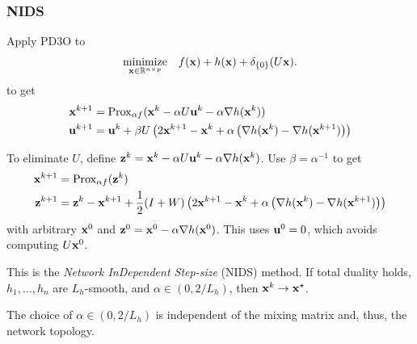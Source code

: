 \documentclass[10pt,mathserif]{beamer}
\begin{document}
\begin{frame}
\frametitle{NIDS}
Apply PD3O to 
\[
\begin{array}{ll}
\underset{{\mathbf{x}}\in\mathbb{R}^{n\times p}}{\mbox{minimize}} & f({\mathbf{x}}) + h({\mathbf{x}}) + \delta_{\{0\}}(U{\mathbf{x}}).
\end{array}
\]
to get
\begin{align*}
  {\mathbf{x}}^{k+1} & = \mathrm{Prox}_{\alpha f}({\mathbf{x}}^k - \alpha U  {\mathbf{u}}^k - \alpha \nabla h({\mathbf{x}}^k))\\
  {\mathbf{u}}^{k+1} & = {\mathbf{u}}^k + \beta U\left(2{\mathbf{x}}^{k+1}-{\mathbf{x}}^{k} + \alpha \left(\nabla h({\mathbf{x}}^k) - \nabla h({\mathbf{x}}^{k+1})\right)\right)
\end{align*}

\end{frame}

\begin{frame}
To eliminate $U$, define ${\mathbf{z}}^k = {\mathbf{x}}^k - \alpha U  {\mathbf{u}}^k - \alpha \nabla h({\mathbf{x}}^k)$. Use $\beta=\alpha^{-1}$ to get
\begin{align*}
  {\mathbf{x}}^{k+1} & = \mathrm{Prox}_{\alpha f}({\mathbf{z}}^k)\\
  {\mathbf{z}}^{k+1} & = {\mathbf{z}}^k - {\mathbf{x}}^{k+1} + \frac{1}{2}(I+W)\left(2{\mathbf{x}}^{k+1}-{\mathbf{x}}^k + \alpha \left(\nabla h({\mathbf{x}}^k) - \nabla h({\mathbf{x}}^{k+1})\right)\right)
\end{align*}
with arbitrary ${\mathbf{x}}^0$ and ${\mathbf{z}}^0 = {\mathbf{x}}^0 - \alpha \nabla h({\mathbf{x}}^0)$. This uses ${\mathbf{u}}^0=0$, which avoids computing $U{\mathbf{x}}^0$.
\bigskip

This is the \emph{Network InDependent Step-size} (NIDS) method.
If total duality holds, $h_1,\dots,h_n$ are $L_h$-smooth, and $\alpha \in(0,2/L_h)$, then ${\mathbf{x}}^k\rightarrow {\mathbf{x}}^\star$.
\bigskip

The choice of $\alpha\in(0,2/L_h)$ is independent of the mixing matrix and, thus, the network topology.
\end{frame}


\end{document}
